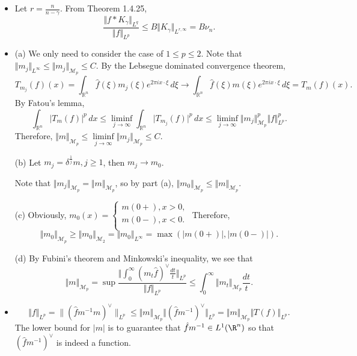 \begin{itemize}
\item[2.5.5]
Let $r=\frac{n}{n-\gamma}$. 
From Theorem 1.4.25, $$\frac{\Vert f*K_\gamma\Vert_{L^q}}{\Vert f\Vert _{L^p}}
\leq B\Vert K_\gamma\Vert_{L^{r,\infty}}=B\nu_n.$$

\item[2.5.6]
(a) We only need to consider the case of $1\leq p\leq 2$.
Note that $\Vert m_j\Vert_{L^\infty}\leq \Vert m_j\Vert _{\mathscr{M}_p}\leq C.$
By the Lebsegue dominated convergence theorem,
$$T_{m_j}(f)(x)=\int_{\mathbb{R}^n}\hat{f}(\xi)m_j(\xi)e^{2\pi ix\cdot\xi}\,d\xi
\rightarrow \int_{\mathbb{R}^n}\hat{f}(\xi)m(\xi)e^{2\pi ix\cdot\xi}\,d\xi
=T_m(f)(x).$$
By Fatou's lemma,$$\int_{\mathbb{R}^n}\vert T_m(f)\vert^p\,dx
\leq \liminf_{j\rightarrow\infty} \int _{\mathbb{R}^n}\vert T_{m_j}(f)\vert^p\,dx
\leq \liminf_{j\rightarrow\infty}\Vert m_j\Vert^p_{\mathscr{M}_p}\Vert f\Vert _{L^p}^p.$$
Therefore, $\Vert m\Vert_{\mathscr{M}_{p}}
\leq \liminf\limits_{j\rightarrow\infty}\Vert m_j\Vert_{\mathscr{M}_{p}}\leq C.$

(b)
Let $m_j=\delta^{\frac1j}m, j\geq 1$, then $m_j\rightarrow m_0$.

Note that $\Vert m_j\Vert_{\mathscr{M}_{p}}=\Vert m\Vert_{\mathscr{M}_{p}}$, so by part (a),
$\Vert m_0\Vert_{\mathscr{M}_{p}}\leq \Vert m\Vert_{\mathscr{M}_{p}}.$

(c) 
Obviously, $m_0(x)=
\begin{cases}
m(0+),x>0,\\
m(0-),x<0.\\
\end{cases}$
Therefore, $$\Vert m_0\Vert_{\mathscr{M}_p}\geq \Vert m_0\Vert_{\mathscr{M}_2}
=\Vert m_0\Vert_{L^\infty}=\max(\vert m(0+)\vert,\vert m(0-)\vert).$$

(d)
By Fubini's theorem and Minkowski's inequality, we see that
$$\Vert m\Vert_{\mathscr{M}_p}
=\sup \frac{\big\Vert \int_0^\infty(m_t\hat{f})^\vee\frac{dt}{t}\big\Vert_{L^p}}{\Vert f\Vert_{L^p}}
\leq \int_0^\infty \Vert m_t\Vert_{\mathscr{M}_p}\frac{dt}{t}.$$

\item[2.5.7]
$$\Vert f\Vert_{L^p}=\|(\hat{f}m^{-1}m)^\vee\|_{L^p}
\leq \Vert m\Vert _{\mathscr{M}_p}\Vert(\hat{f}m^{-1})^\vee\Vert_{L^p}
= \Vert m\Vert _{\mathscr{M}_p}\Vert T(f)\Vert_{L^p}.$$
The lower bound for $|m|$ is to guarantee that $\hat{f}m^{-1}\in L^1(\R^n)$ 
so that $(\hat{f}m^{-1})^\vee$ is indeed a function.


\end{itemize}
